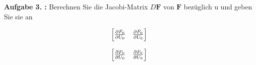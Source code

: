\begin{mybox}
	\textbf{Aufgabe 3. :} Berechnen Sie die Jacobi-Matrix $D\mathbf{F}$ von $\mathbf{F}$ bezüglich u und geben Sie sie an
\end{mybox}
\begin{equation}
	\begin{bmatrix}
		\pdv{F_0}{U_0} & \pdv{F_0}{U_0}  \\
		
	\end{bmatrix}
\end{equation}

\begin{equation}
	\begin{bmatrix}
		\pdv{F_0}{U_0} & \pdv{F_0}{U_0}  \\
		
	\end{bmatrix}
\end{equation}



